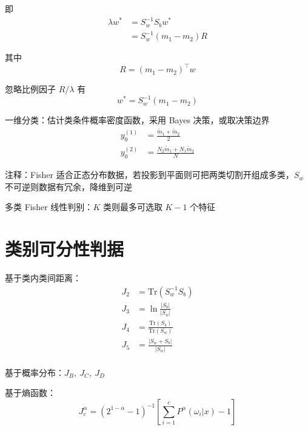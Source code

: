 \documentclass[openany]{ctexbook}
\theoremstyle{kaiti}
\theoremstyle{normal}
\begin{document}
即
\begin{equation}
\begin{aligned}
  \lambda w^*
  &=S_{w}^{-1}S_bw^*\\
  &=S_{w}^{-1}\left(m_1-m_2 \right)R
\end{aligned}
\end{equation}

其中
\begin{equation}
R=\left(m_1-m_2 \right)^{\top}w
\end{equation}

忽略比例因子 $R/\lambda$ 有
\begin{equation}
w^*=S_{w}^{-1}\left(m_1-m_2 \right)
\end{equation}

一维分类：估计类条件概率密度函数，采用 Bayes 决策，或取决策边界
\begin{equation}
\begin{aligned}
  y_{0}^{\left(1 \right)}&=\frac{\tilde{m}_1+\tilde{m}_2}{2}\\
  y_{0}^{\left(2 \right)}&=\frac{N_2\tilde{m}_1+N_1\tilde{m}_2}{N}
\end{aligned}
\end{equation}

注释：Fisher 适合正态分布数据，若投影到平面则可把两类切割开组成多类，$S_w$ 不可逆则数据有冗余，降维到可逆

多类 Fisher 线性判别：$K$ 类则最多可选取 $K-1$ 个特征

\section{类别可分性判据}

基于类内类间距离：
\begin{equation}
\begin{aligned}
  J_2&=\mathrm{Tr}\left(S_{w}^{-1}S_b \right)\\
  J_3&=\ln\frac{|S_b|}{|S_w|}\\
  J_4&=\frac{\mathrm{Tr}\left(S_b \right)}{\mathrm{Tr}\left(S_w \right)}\\
  J_5&=\frac{|S_w+S_b|}{|S_w|}\\
\end{aligned}
\end{equation}

基于概率分布：$J_B,~J_C,~J_D$

基于熵函数：
\begin{equation}
J_{c}^{\alpha}=\left(2^{1-\alpha}-1 \right)^{-1}\left[\sum_{i=1}^{c}P^{\alpha}\left(\omega_i|x \right)-1 \right]
\end{equation}
\end{document}
